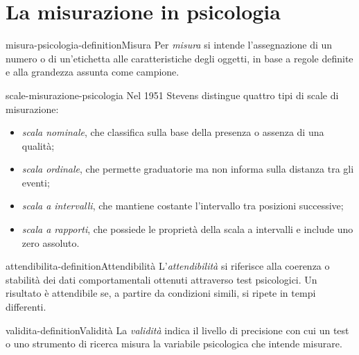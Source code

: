 \documentclass[preview]{standalone}
\begin{document}
\genpage

\section{La misurazione in psicologia}

\begin{snippetdefinition}{misura-psicologia-definition}{Misura}
    Per \emph{misura} si intende l'assegnazione di un numero o di un'etichetta
    alle caratteristiche degli oggetti, in base a regole definite e alla
    grandezza assunta come campione.
\end{snippetdefinition}

\begin{snippet}{scale-misurazione-psicologia}
    Nel 1951 Stevens distingue quattro tipi di scale di misurazione:
    \begin{itemize}
        \item \emph{scala nominale}, che classifica sulla base della presenza o
        assenza di una qualità;
        \item \emph{scala ordinale}, che permette graduatorie ma non informa
        sulla distanza tra gli eventi;
        \item \emph{scala a intervalli}, che mantiene costante l'intervallo tra
        posizioni successive;
        \item \emph{scala a rapporti}, che possiede le proprietà della scala a
        intervalli e include uno zero assoluto.
    \end{itemize}
\end{snippet}

\begin{snippetdefinition}{attendibilita-definition}{Attendibilità}
    L'\emph{attendibilità} si riferisce alla coerenza o stabilità dei dati
    comportamentali ottenuti attraverso test psicologici. Un risultato è
    attendibile se, a partire da condizioni simili, si ripete in tempi
    differenti.
\end{snippetdefinition}

\begin{snippetdefinition}{validita-definition}{Validità}
    La \emph{validità} indica il livello di precisione con cui un test o uno
    strumento di ricerca misura la variabile psicologica che intende misurare.
\end{snippetdefinition}
\end{document}
